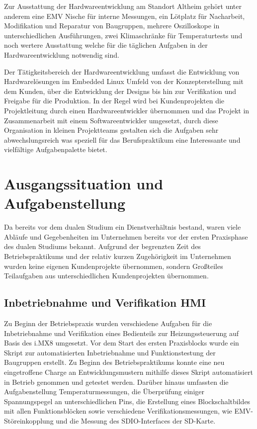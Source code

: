 \documentclass[praktikum,german]{hgbthesis}
\begin{document}
Zur Ausstattung der Hardwareentwicklung am Standort Altheim gehört unter anderem eine EMV Nische für interne Messungen, ein Lötplatz für Nacharbeit, Modifikation und Reparatur von Baugruppen, mehrere Oszilloskope in unterschiedlichen Ausführungen, zwei Klimaschränke für Temperaturtests und noch wertere Ausstattung welche für die täglichen Aufgaben in der Hardwareentwicklung notwendig sind.

Der Tätigkeitsbereich der Hardwareentwicklung umfasst die Entwicklung von Hardwarelösungen im Embedded Linux Umfeld von der Konzepterstellung mit dem Kunden, über die Entwicklung der Designs bis hin zur Verifikation und Freigabe für die Produktion. In der Regel wird bei Kundenprojekten die Projektleitung durch einen Hardwareentwickler übernommen und das Projekt in Zusammenarbeit mit einem Softwareentwickler umgesetzt, durch diese Organisation in kleinen Projektteams gestalten sich die Aufgaben sehr abwechslungsreich was speziell für das Berufspraktikum eine Interessante und vielfältige Aufgabenpalette bietet.

\chapter{Ausgangssituation und Aufgabenstellung}
%

Da bereits vor dem dualen Studium ein Dienstverhältnis bestand, waren viele Abläufe und Gegebenheiten im Unternehmen bereits vor der ersten Praxisphase des dualen Studiums bekannt. Aufgrund der begrenzten Zeit des Betriebspraktikums und der relativ kurzen Zugehörigkeit im Unternehmen wurden keine eigenen Kundenprojekte übernommen, sondern Großteiles Teilaufgaben aus unterschiedlichen Kundenprojekten übernommen. 

\section{Inbetriebnahme und Verifikation HMI}
Zu Beginn der Betriebspraxis wurden verschiedene Aufgaben für die Inbetriebnahme und Verifikation eines Bedienteils zur Heizungssteuerung auf Basis des i.MX8 umgesetzt.
Vor dem Start des ersten Praxisblocks wurde ein Skript zur automatisierten Inbetriebnahme und Funktionstestung der Baugruppen erstellt. Zu Beginn des Betriebspraktikums konnte eine neu eingetroffene Charge an Entwicklungsmustern mithilfe dieses Skript automatisiert in Betrieb genommen und getestet werden. Darüber hinaus umfassten die Aufgabenstellung Temperaturmessungen, die Überprüfung einiger Spannungspegel an unterschiedlichen Pins, die Erstellung eines Blockschaltbildes mit allen Funktionsblöcken sowie verschiedene Verifikationsmessungen, wie EMV-Störeinkopplung und die Messung des SDIO-Interfaces der SD-Karte.
\end{document}
